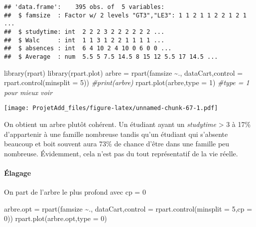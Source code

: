 \documentclass[
]{article}
\newenvironment{Shaded}{\begin{snugshade}}{\end{snugshade}}
\newcommand{\AttributeTok}[1]{\textcolor[rgb]{0.77,0.63,0.00}{#1}}
\newcommand{\CommentTok}[1]{\textcolor[rgb]{0.56,0.35,0.01}{\textit{#1}}}
\newcommand{\DecValTok}[1]{\textcolor[rgb]{0.00,0.00,0.81}{#1}}
\newcommand{\FunctionTok}[1]{\textcolor[rgb]{0.00,0.00,0.00}{#1}}
\newcommand{\NormalTok}[1]{#1}
\newcommand{\OtherTok}[1]{\textcolor[rgb]{0.56,0.35,0.01}{#1}}
\newcommand{\SpecialCharTok}[1]{\textcolor[rgb]{0.00,0.00,0.00}{#1}}
\begin{document}
\begin{verbatim}
## 'data.frame':    395 obs. of  5 variables:
##  $ famsize  : Factor w/ 2 levels "GT3","LE3": 1 1 2 1 1 2 2 1 2 1 ...
##  $ studytime: int  2 2 2 3 2 2 2 2 2 2 ...
##  $ Walc     : int  1 1 3 1 2 2 1 1 1 1 ...
##  $ absences : int  6 4 10 2 4 10 0 6 0 0 ...
##  $ Average  : num  5.5 5 7.5 14.5 8 15 12 5.5 17 14.5 ...
\end{verbatim}

\begin{Shaded}
\begin{Highlighting}[]
\FunctionTok{library}\NormalTok{(rpart)}
\FunctionTok{library}\NormalTok{(rpart.plot)}
\NormalTok{arbre }\OtherTok{=} \FunctionTok{rpart}\NormalTok{(famsize }\SpecialCharTok{\textasciitilde{}}\NormalTok{., dataCart,}\AttributeTok{control =} \FunctionTok{rpart.control}\NormalTok{(}\AttributeTok{minsplit =} \DecValTok{5}\NormalTok{))}
\CommentTok{\#print(arbre)}
\FunctionTok{rpart.plot}\NormalTok{(arbre,}\AttributeTok{type =} \DecValTok{1}\NormalTok{) }\CommentTok{\#type = 1 pour mieux voir }
\end{Highlighting}
\end{Shaded}

\texttt{[image: ProjetAdd\_files/figure-latex/unnamed-chunk-67-1.pdf]}

On obtient un arbre plutôt cohérent. Un étudiant ayant un
\emph{studytime} \textgreater{} 3 à 17\% d'appartenir à une famille
nombreuse tandis qu'un étudiant qui s'absente beaucoup et boit souvent
aura 73\% de chance d'être dans une famille peu nombreuse. Évidemment,
cela n'est pas du tout représentatif de la vie réelle.

\hypertarget{uxe9lagage}{%
\paragraph{Élagage}\label{uxe9lagage}}

On part de l'arbre le plus profond avec cp = 0

\begin{Shaded}
\begin{Highlighting}[]
\NormalTok{arbre.opt }\OtherTok{=} \FunctionTok{rpart}\NormalTok{(famsize }\SpecialCharTok{\textasciitilde{}}\NormalTok{., dataCart,}\AttributeTok{control =} \FunctionTok{rpart.control}\NormalTok{(}\AttributeTok{minsplit =} \DecValTok{5}\NormalTok{,}\AttributeTok{cp =} \DecValTok{0}\NormalTok{))}
\FunctionTok{rpart.plot}\NormalTok{(arbre.opt,}\AttributeTok{type =} \DecValTok{0}\NormalTok{)}
\end{Highlighting}
\end{Shaded}
\end{document}
